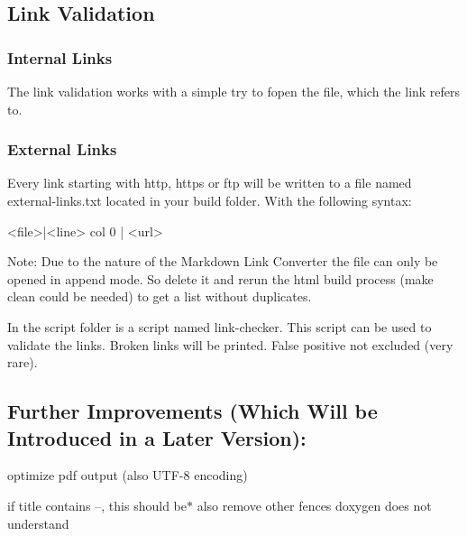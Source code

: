 \subsection*{Link Validation}

\subsubsection*{Internal Links}

The link validation works with a simple try to {\ttfamily fopen} the file, which the link refers to.

\subsubsection*{External Links}

Every link starting with {\ttfamily http}, {\ttfamily https} or {\ttfamily ftp} will be written to a file named {\ttfamily external-\/links.\+txt} located in your build folder. With the following syntax\+: \begin{DoxyVerb}    <file>|<line> col 0 | <url>
\end{DoxyVerb}


Note\+: Due to the nature of the Markdown Link Converter the file can only be opened in append mode. So delete it and rerun the html build process ({\ttfamily make clean} could be needed) to get a list without duplicates.

In the script folder is a script named {\ttfamily link-\/checker}. This script can be used to validate the links. Broken links will be printed. False positive not excluded (very rare).

\subsection*{Further Improvements (Which Will be Introduced in a Later Version)\+:}


\begin{DoxyItemize}
\item optimize pdf output (also U\+T\+F-\/8 encoding)
\item if title contains --, this should be$\ast$ also remove other fences doxygen does not understand 
\end{DoxyItemize}